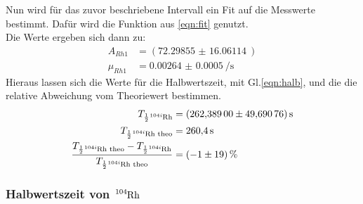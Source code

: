 \noindent
Nun wird für das zuvor beschriebene Intervall ein Fit auf die Messwerte bestimmt. 
Dafür wird die Funktion aus \ref{eqn:fit} genutzt.\\
Die Werte ergeben sich dann zu:
\begin{align*}
    A_{Rh1}&=(\SI{72.29855(1606114)}{})\\
    \mu_{Rh1}&=\SI{0.00264(000050)}{\per\second}
\end{align*}
Hieraus lassen sich die Werte für die Halbwertszeit, mit Gl.\ref{eqn:halb}, und die die relative Abweichung vom Theoriewert\cite{Rhodium} bestimmen.
\begin{align*}
    T_{\frac{1}{2}\ce{^{104i}_{}Rh}}&= \SI{262.38900(4969076)}{\second}\\
    T_{\frac{1}{2}\ce{^{104i}_{}Rh}\text{ theo}}&= \SI{260.4}{\second}\\
    \frac{T_{\frac{1}{2}\ce{^{104i}_{}Rh} \text{ theo}} - T_{\frac{1}{2}\ce{^{104i}_{}Rh}}}{T_{\frac{1}{2}\ce{^{104i}_{}Rh}\text{ theo}}}&=\SI{-01(19)}{\percent}
\end{align*}

\subsubsection{Halbwertszeit von $\ce{^{104}_{}Rh}$}